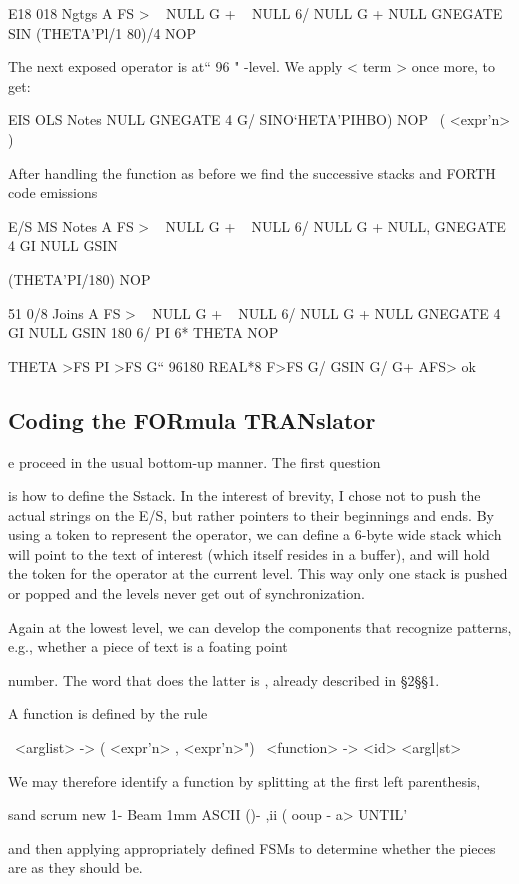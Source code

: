 E18 018 Ngtgs
A FS > \ < subject >
NULL G + \ < term >
NULL 6/
NULL G +
NULL GNEGATE
SIN (THETA'Pl/1 80)/4 NOP

The next exposed operator is at“ 96 " -level. We apply < term >
once more, to get:

EIS OLS Notes
NULL GNEGATE
4 G/
SINO‘HETA'PIHBO) NOP \ ( <expr'n> )

After handling the function as before we find the successive stacks
and FORTH code emissions

E/S MS Notes
A FS > \ < subject >
NULL G + \ < term >
NULL 6/
NULL G +
NULL, GNEGATE
4 GI
NULL GSIN

(THETA'PI/180) NOP


51 0/8 Joins
A FS > \ < subject >
NULL G + \ < term >
NULL 6/
NULL G +
NULL GNEGATE
4 GI
NULL GSIN
180 6/
PI 6*
THETA NOP

THETA >FS PI >FS G“ 96180 REAL*8 F>FS
G/ GSIN %
G/ G+ AFS> ok

\subsection{Coding the FORmula TRANslator}

e proceed in the usual bottom-up manner. The first question

is how to define the Sstack. In the interest of brevity, I chose
not to push the actual strings on the E/S, but rather pointers to
their beginnings and ends. By using a token to represent the
operator, we can define a 6-byte wide stack which will point to
the text of interest (which itself resides in a buffer), and will hold
the token for the operator at the current level. This way only one
stack is pushed or popped and the levels never get out of
synchronization.

Again at the lowest level, we can develop the components that
recognize patterns, e.g., whether a piece of text is a foating point

number. The word that does the latter is , already described
in §2§§1.

A function is defined by the rule

\ <arglist> -> ( <expr'n> {, <expr'n>}")
\ <function> -> <id> <argl|st>

We may therefore identify a function by splitting at the first left
parenthesis,

sand scrum new
1- Beam 1mm ASCII ()- ,ii (
ooup - a> UNTIL'

and then applying appropriately defined FSMs to determine
whether the pieces are as they should be.

